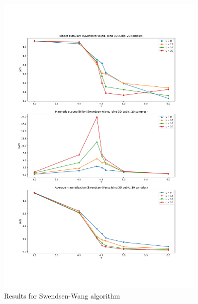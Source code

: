 \documentclass[11pt,a4paper]{article}
\begin{document}
\begin{figure}[b]
	\includegraphics[width=0.9\textwidth]{Swendsen_Wang.pdf}
	\caption[short]{Results for Swendsen-Wang algorithm}
	\label{fig:1}
\end{figure}
\end{document}
